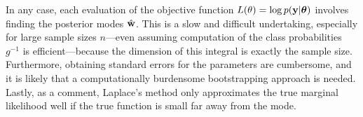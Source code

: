 In any case, each evaluation of the objective function $L(\theta) = \log p({\mathbf y}|{\bm\theta})$ involves finding the posterior modes $\hat{{\mathbf w}}$.
This is a slow and difficult undertaking, especially for large sample sizes $n$---even assuming computation of the class probabilities $g^{-1}$ is efficient---because the dimension of this integral is exactly the sample size.
Furthermore, obtaining standard errors for the parameters are cumbersome, and it is likely that a computationally burdensome bootstrapping approach is needed.
Lastly, as a comment, Laplace's method only approximates the true marginal likelihood well if the true function is small far away from the mode.

%
%
